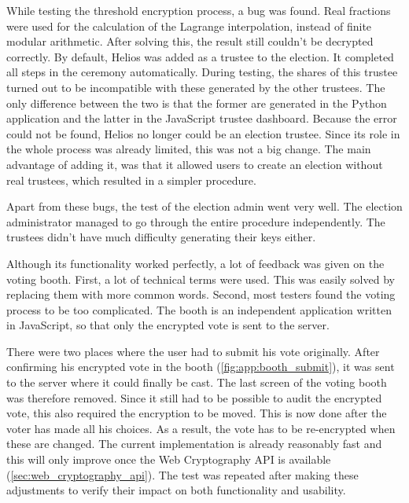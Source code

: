 \par While testing the threshold encryption process, a bug was found. Real fractions were used for the calculation of the Lagrange interpolation, instead of finite modular arithmetic. After solving this, the result still couldn't be decrypted correctly. By default, Helios was added as a trustee to the election. It completed all steps in the ceremony automatically. During testing, the shares of this trustee turned out to be incompatible with these generated by the other trustees. The only difference between the two is that the former are generated in the Python application and the latter in the JavaScript trustee dashboard. Because the error could not be found, Helios no longer could be an election trustee. Since its role in the whole process was already limited, this was not a big change. The main advantage of adding it, was that it allowed users to create an election without real trustees, which resulted in a simpler procedure.

\par Apart from these bugs, the test of the election admin went very well. The election administrator managed to go through the entire procedure independently. The trustees didn't have much difficulty generating their keys either.

\par Although its functionality worked perfectly, a lot of feedback was given on the voting booth. First, a lot of technical terms were used. This was easily solved by replacing them with more common words. Second, most testers found the voting process to be too complicated. The booth is an independent application written in JavaScript, so that only the encrypted vote is sent to the server.

\par There were two places where the user had to submit his vote originally. After confirming his encrypted vote in the booth (\ref{fig:app:booth_submit}), it was sent to the server where it could finally be cast. The last screen of the voting booth was therefore removed. Since it still had to be possible to audit the encrypted vote, this also required the encryption to be moved. This is now done after the voter has made all his choices. As a result, the vote has to be re-encrypted when these are changed. The current implementation is already reasonably fast and this will only improve once the Web Cryptography API is available (\ref{sec:web_cryptography_api}). The test was repeated after making these adjustments to verify their impact on both functionality and usability.

